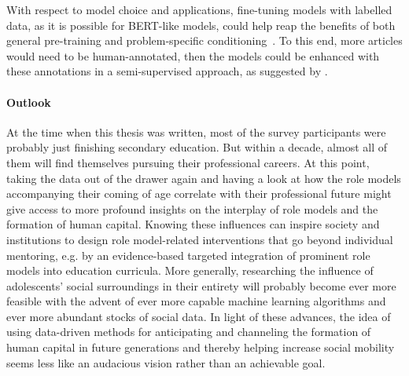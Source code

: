 With respect to model choice and applications, fine-tuning models with labelled data, as it is possible for BERT-like models, could help reap the benefits of both general pre-training and problem-specific conditioning~\autocite{devlin_bert_2019}. To this end, more articles would need to be human-annotated, then the models could be enhanced with these annotations in a semi-supervised approach, as suggested by \textcite{fenske_using_2022}.


\paragraph{Outlook}
At the time when this thesis was written, most of the survey participants were probably just finishing secondary education. But within a decade, almost all of them will find themselves pursuing their professional careers. At this point, taking the data out of the drawer again and having a look at how the role models accompanying their coming of age correlate with their professional future might give access to more profound insights on the interplay of role models and the formation of human capital. Knowing these influences can inspire society and institutions to design role model-related interventions that go beyond individual mentoring, e.g. by an evidence-based targeted integration of prominent role models into education curricula. More generally, researching the influence of adolescents' social surroundings in their entirety will probably become ever more feasible with the advent of ever more capable machine learning algorithms and ever more abundant stocks of social data. In light of these advances, the idea of using data-driven methods for anticipating and channeling the formation of human capital in future generations and thereby helping increase social mobility seems less like an audacious vision rather than an achievable goal.